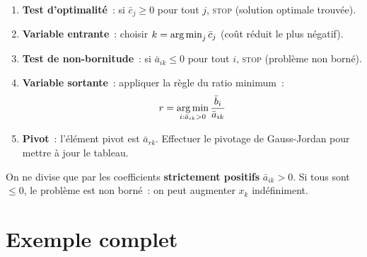 \begin{algorithme}[title=\textbf{Une it\'eration du simplexe (minimisation)}]
\begin{enumerate}
  \item \textbf{Test d'optimalit\'e}~: si $\bar{c}_j \ge 0$ pour tout $j$,
        \textsc{stop} (solution optimale trouv\'ee).
  \item \textbf{Variable entrante}~: choisir $k = \operatorname*{arg\,min}_j \bar{c}_j$
        (co\^ut r\'eduit le plus n\'egatif).
  \item \textbf{Test de non-bornitude}~: si $\bar{a}_{ik} \le 0$ pour
        tout $i$, \textsc{stop} (probl\`eme non born\'e).
  \item \textbf{Variable sortante}~: appliquer la r\`egle du ratio minimum~:
        \[
          r = \operatorname*{arg\,min}_{i : \bar{a}_{ik} > 0}
            \frac{\bar{b}_i}{\bar{a}_{ik}}
        \]
  \item \textbf{Pivot}~: l'\'el\'ement pivot est $\bar{a}_{rk}$.  Effectuer
        le pivotage de Gauss-Jordan pour mettre \`a jour le tableau.
\end{enumerate}
\end{algorithme}

\begin{attention}[title=\textbf{R\`egle du ratio}]
On ne divise que par les coefficients \textbf{strictement positifs}
$\bar{a}_{ik} > 0$.  Si tous sont $\le 0$, le probl\`eme est non born\'e~:
on peut augmenter $x_k$ ind\'efiniment.
\end{attention}

\section{Exemple complet}

